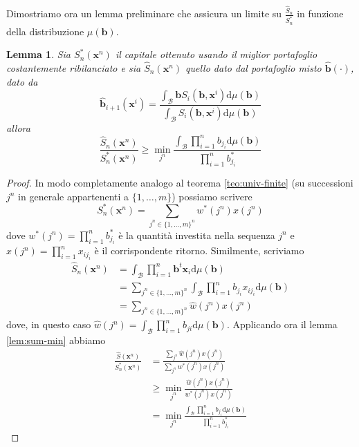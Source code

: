 \documentclass[a4paper,11pt]{book}
\theoremstyle{plain}
\newtheorem{lemma}[teo]{Lemma}
\theoremstyle{definition}
\theoremstyle{remark}
\newcommand{\x}{\bm{x}}
\newcommand{\B}{\bm{b}}
\newcommand{\bh}{\hat{\bm{b}}}
\newcommand{\Sh}{\hat{S}}
\newcommand{\dmu}{\text{d}\mu(\B)}
\begin{document}
Dimostriamo ora un lemma preliminare che assicura un limite su $\frac{\Sh_n}{S_n^*}$ in funzione della distribuzione $\mu(\B)$.
\begin{lemma}
	Sia $S_n^*(\x^n)$ il capitale ottenuto usando il miglior portafoglio costantemente ribilanciato e sia $\Sh_n(\x^n)$ quello dato dal portafoglio misto $\bh(\cdot)$, dato da
	\begin{equation*}
		\bh_{i+1}(\x^i)=\frac{\int_\mathcal{B}{\B S_i(\B,\x^i)\dmu}}{\int_\mathcal{B}{S_i(\B,\x^i)\dmu}}
	\end{equation*}
	allora
	\begin{equation*}
		\frac{\Sh_n(\x^n)}{S_n^*(\x^n)}\geq \min\limits_{j^n}\frac{\int_\mathcal{B}{\prod_{i = 1}^n{b_{j_i}\dmu}}}{\prod_{i = 1}^n{b^*_{j_i}}}
	\end{equation*}
\end{lemma}
\begin{proof}
	In modo completamente analogo al teorema \ref{teo:univ-finite} (su successioni $j^n$ in generale appartenenti a $\{1,\ldots,m\}$) possiamo scrivere
	\begin{equation*}
		S_n^*(\x^n)=\sum_{j^n\in\{1,\ldots,m\}^n}{w^*(j^n)x(j^n)}
	\end{equation*}	
	dove $w^*(j^n)=\prod_{i = 1}^n{b^*_{j_i}}$ è la quantità investita nella sequenza $j^n$ e $x(j^n) = \prod_{i = 1}^n{x_{ij_i}}$ è il corrispondente ritorno. Similmente, scriviamo
 	\begin{equation*}
		\begin{split}
		\Sh_n(\x^n) & = \int_\mathcal{B}{\prod_{i =1}^n{\B^t\x_i}\dmu}\\
		& = \sum_{j^n\in\{1,\ldots,m\}^n}{\int_\mathcal{B}{\prod_{i =1}^n{b_{j_i}x_{ij_i}}\dmu}}\\
		& = \sum_{j^n\in\{1,\ldots,m\}^n}{\hat{w}(j^n)x(j^n)}
		\end{split}                      
	\end{equation*}
	dove, in questo caso $\hat{w}(j^n) = \int_\mathcal{B}{\prod_{i = 1}^n{b_{ji}}\dmu}$. Applicando ora il lemma \ref{lem:sum-min} abbiamo
	\begin{equation*}
		\begin{split}
		\frac{\Sh(\x^n)}{S_n^*(\x^n)}&=\frac{\sum_{j^n}{\hat{w}(j^n)x(j^n)}}{\sum_{j^n}{w^*(j^n)x(j^n)}}\\
		& \geq \min\limits_{j^n}\frac{\hat{w}(j^n)x(j^n)}{w^*(j^n)x(j^n)}\\
		& = \min\limits_{j^n}\frac{\int_\mathcal{B}{\prod_{i = 1}^n{b_{j_i}}\dmu}}{\prod_{i =1}^n b^*_{j_i}}
		\end{split}
	\end{equation*}
\end{proof}
\end{document}
